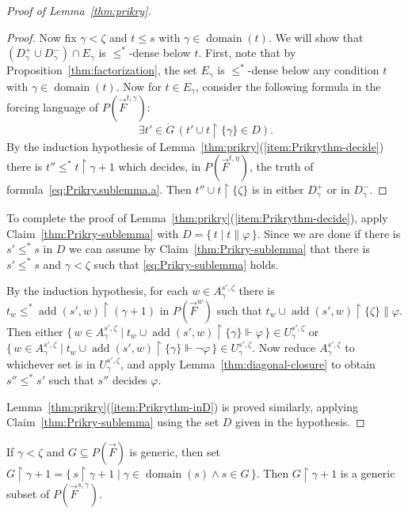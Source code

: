 \documentclass[
twoside,
]{article}
\theoremstyle{definition}
\theoremstyle{remark}
\DeclareMathOperator{\add}{add}
\newcommand{\forces}{\Vdash}
\newcommand{\decides}{\parallel}
\renewcommand{\phi}{\varphi}
\newcommand{\sing}[1]{\{#1\}}
\newcommand{\set}[1]{\{\,#1\,\}}
\newcommand{\restrict}{{\upharpoonright}}
\DeclareMathOperator{\domain}{domain}
\begin{document}
\begin{proof}[Proof of Lemma~\ref{thm:prikry}]
\begin{proof}
    Now fix $\gamma<\zeta$ and $t\leq s$ with $\gamma\in\domain(t)$.   We will show that 
    $(D^{+}_{\gamma}\cup D^{-}_{\gamma})\cap E_{\gamma}$ is
    $\leq^*$-dense below $t$.
    First, note that by Proposition~\ref{thm:factorization}, the set $E_{\gamma}$
    is $\leq^*$-dense below any condition $t$ with
    $\gamma\in\domain(t)$. Now for $t\in E_{\gamma}$, consider the following
    formula  in the forcing language of $P(\vec F^{t,\gamma})$:
    \begin{equation}
      \exists
      t'\in \dot G\, (t'\cup t\restrict\sing\gamma\in D).\label{eq:Prikry.sublemma.a}
    \end{equation}
    By the induction hypothesis of
    Lemma~\ref{thm:prikry}(\ref{item:Prikrythm-decide}) there is
    $t''\leq^* 
    t\restrict\gamma+1$ which decides, in $P(\vec F^{t,\eta})$, the truth of
    formula~\eqref{eq:Prikry.sublemma.a}.   Then
    $t''\cup t\restrict\sing{\zeta}$ is in either $D^{+}_{\gamma}$ or
    in $D^{-}_{\gamma}$. 
  \end{proof}
  
  To complete the proof of
  Lemma~\ref{thm:prikry}(\ref{item:Prikrythm-decide}),  apply
  Claim~\ref{thm:Prikry-sublemma}  with  $D=\set{t\mid t\decides\phi}$.
  Since we are done if there is  $s'\leq^*
  s$ in $D$ we can assume by  
 Claim~\ref{thm:Prikry-sublemma}  that there is $s'\leq^* s$ and
  $\gamma<\zeta$ such that \eqref{eq:Prikry-sublemma} holds.

  By the induction hypothesis, for each $w\in A^{s',\zeta}_{\gamma}$
  there is $t_w\le^* \add(s',w)\restrict(\gamma+1)$ in $P(\vec F^{w})$ such that
  $t_w\cup\add(s',w)\restrict\sing{\zeta} 
  \decides\phi$.  Then  either $\set{w\in
    A^{s',\zeta}_{\gamma}\mid t_w\cup
    \add(s',w)\restrict\sing{\gamma}\forces\phi} \in
  U^{s',\zeta}_{\gamma}$ or $\set{w\in
    A^{s',\zeta}_{\gamma}\mid t_w\cup
    \add(s',w)\restrict\sing{\gamma}\forces\lnot\phi} \in
  U^{s',\zeta}_{\gamma}$.   Now reduce $A^{s',\zeta}_{\gamma}$ to
  whichever  set is in $U^{s',\zeta}_{\gamma}$, and apply
  Lemma~\ref{thm:diagonal-closure} to obtain $s''\leq^* s'$ such that
  $s''$ decides $\phi$.

 Lemma~\ref{thm:prikry}(\ref{item:Prikrythm-inD}) is proved similarly,
 applying Claim~\ref{thm:Prikry-sublemma} using the set $D$ given in
 the hypothesis.
\end{proof}

If $\gamma<\zeta$ and $G\subseteq P(\vec F)$ is generic, then set
$G\restrict \gamma+1=\set{s\restrict\gamma+1\mid
  \gamma\in\domain(s)\land s\in G}$.  Then
$G\restrict\gamma+1$ is a generic subset of $P(\vec F^{s,\gamma})$.
\end{document}
